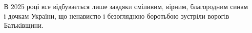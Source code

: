 
\thispagestyle{empty}
\null\vspace{6cm}
\noindent{}

\vfill
\noindent\hspace{1.5cm}
\begin{minipage}{\linewidth-1.5cm}
\scmain
\raggedright
В 2025 році все відбувається лише завдяки\newline
сміливим, вірним, благородним синам і\newline
дочкам України, що ненавистю і безоглядною\newline
боротьбою зустріли ворогів Батьківщини.
\end{minipage}

\clearpage


\thispagestyle{empty}
\null\vspace{0.5cm}
\noindent{}

\vspace{1.56cm}  %
\noindent{}

\vspace{0.1cm}
\noindent{}

\vspace{1.5cm}
\noindent{}

\smallskip
\noindent\htitlespace{\scmain \BookTitleDe{}}

\vspace{1.5cm}
\noindent\htitlespace{\AuflageDe}

\smallskip
\noindent\htitlespace{\AuflageDeSecond}

\vspace{0.5cm}
\noindent\htitlespace{\HerausgegebenDe}

\vfill
\noindent\htitlespace{\scmain \PublisherDe{} \bouillondot{} \CityDe{} \bouillondot{} \YearDe}
\clearpage

\thispagestyle{empty}
\null\vspace{0.5cm}
\noindent{}

\vspace{1.56cm}  %
\noindent{}

